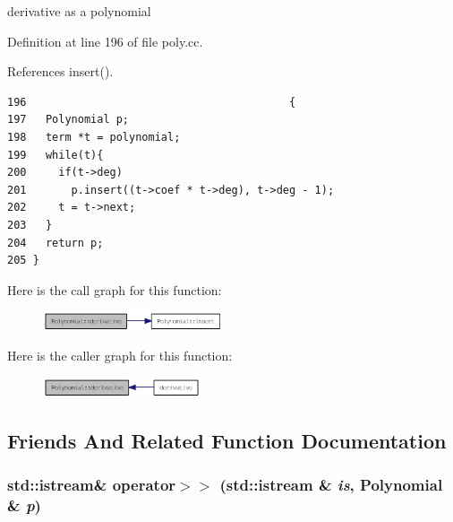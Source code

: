 derivative as a polynomial 

Definition at line 196 of file poly.cc.

References insert().

\begin{Code}\begin{verbatim}196                                         {
197   Polynomial p;
198   term *t = polynomial;
199   while(t){
200     if(t->deg)
201       p.insert((t->coef * t->deg), t->deg - 1);
202     t = t->next;
203   }
204   return p;
205 }
\end{verbatim}
\end{Code}




Here is the call graph for this function:\nopagebreak
\begin{figure}[H]
\begin{center}
\leavevmode
\includegraphics[width=151pt]{classPolynomial_aef1ed2dbc29d419c58c6d61b35853c3_cgraph}
\end{center}
\end{figure}


Here is the caller graph for this function:\nopagebreak
\begin{figure}[H]
\begin{center}
\leavevmode
\includegraphics[width=132pt]{classPolynomial_aef1ed2dbc29d419c58c6d61b35853c3_icgraph}
\end{center}
\end{figure}


\subsection{Friends And Related Function Documentation}
\hypertarget{classPolynomial_1446b464245742ccedeacb27fd794bab}{
\subsubsection[operator$>$$>$]{\setlength{\rightskip}{0pt plus 5cm}std::istream\& operator$>$$>$ (std::istream \& {\em is}, \/  {\bf Polynomial} \& {\em p})}}
\label{classPolynomial_1446b464245742ccedeacb27fd794bab}


